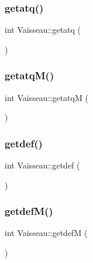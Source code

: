 \mbox{\label{class_vaisseau_a03d9f614943176d1e1d71d99f9d7f465}} 
\subsubsection{\texorpdfstring{getatq()}{getatq()}}
{\footnotesize\ttfamily int Vaisseau\+::getatq (\begin{DoxyParamCaption}{ }\end{DoxyParamCaption})}

\mbox{\label{class_vaisseau_a893c8a6199e3e79460891fafb0b16fba}} 
\subsubsection{\texorpdfstring{getatq\+M()}{getatqM()}}
{\footnotesize\ttfamily int Vaisseau\+::getatqM (\begin{DoxyParamCaption}{ }\end{DoxyParamCaption})}

\mbox{\label{class_vaisseau_a48d7facfa7c34a784bfbee4c4b1100ce}} 
\subsubsection{\texorpdfstring{getdef()}{getdef()}}
{\footnotesize\ttfamily int Vaisseau\+::getdef (\begin{DoxyParamCaption}{ }\end{DoxyParamCaption})}

\mbox{\label{class_vaisseau_aa983d5040f7c19a9dfcb907618fda321}} 
\subsubsection{\texorpdfstring{getdef\+M()}{getdefM()}}
{\footnotesize\ttfamily int Vaisseau\+::getdefM (\begin{DoxyParamCaption}{ }\end{DoxyParamCaption})}


